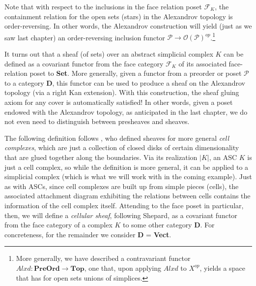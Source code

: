 \documentclass[a4paper]{book}
\theoremstyle{definition}
\theoremstyle{definition}
\theoremstyle{definition}
\theoremstyle{theorem}
\theoremstyle{definition}
\begin{document}
	Note that with respect to the inclusions in the face relation poset $\mathcal{F}_K$, the containment relation for the open sets (stars) in the Alexandrov topology is order-reversing. In other words, the Alexandrov construction will yield (just as we saw last chapter) an order-reversing inclusion functor $\mathcal{P} \rightarrow \mathscr{O}(\mathcal{P})^{op}$.\footnote{More generally, we have described a contravariant functor $Alxd: \textbf{PreOrd} \rightarrow \textbf{Top}$, one that, upon applying $Alxd$ to $X^{op}$, yields a space that has for open sets unions of simplices.} \par 
	It turns out that a sheaf (of sets) over an abstract simplicial complex $K$ can be defined as a covariant functor from the face category $\mathcal{F}_K$ of its associated face-relation poset to \textbf{Set}. More generally, given a functor from a preorder or poset $\mathcal{P}$ to a category \textbf{D}, this functor can be used to produce a sheaf on the Alexandrov topology (via a right Kan extension). With this construction, the sheaf gluing axiom for any cover is automatically satisfied! In other words, given a poset endowed with the Alexandrov topology, as anticipated in the last chapter, we do not even need to distinguish between presheaves and sheaves. \par 
The following definition follows \cite{shepard_cellular_1985}, who defined sheaves for more general \textit{cell complexes}, which are just a collection of closed disks of certain dimensionality that are glued together along the boundaries. Via its realization $|K|$, an ASC $K$ is just a cell complex, so while the definition is more general, it can be applied to a simplicial complex (which is what we will work with in the coming example). Just as with ASCs, since cell complexes are built up from simple pieces (cells), the associated attachment diagram exhibiting the relations between cells contains the information of the cell complex itself. Attending to the face poset in particular, then, we will define a \textit{cellular sheaf}, following Shepard, as a covariant functor from the face category of a complex $K$ to some other category \textbf{D}. For concreteness, for the remainder we consider \textbf{D} = \textbf{Vect}.
\end{document}
